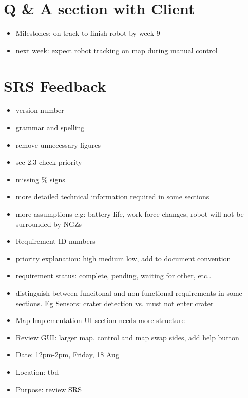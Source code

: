 \documentclass[11pt, a4paper]{article}
\begin{document}
\section{Q \& A section with Client}
\begin{itemize}
\item Milestones: on track to finish robot by week 9
\item next week: expect robot tracking on map during manual control
\end{itemize}

\section{SRS Feedback}
\begin{itemize}
\item version number
\item grammar and spelling
\item remove unnecessary figures
\item sec 2.3 check priority
\item missing \% signs
\item more detailed technical information required in some sections
\item more assumptions e.g: battery life, work force changes, robot will not be surrounded by NGZs
\item Requirement ID numbers
\item priority explanation: high medium low, add to document convention
\item requirement status: complete, pending, waiting for other, etc..
\item distinguish between funcitonal and non functional requirements in some sections. Eg Sensors: crater detection vs. must not enter crater
\item Map Implementation UI section needs more structure
\item Review GUI: larger map, control and map swap sides, add help button
\end{itemize}


\begin{itemize}
\item Date: 12pm-2pm, Friday, 18 Aug
\item Location: tbd
\item Purpose: review SRS
\end{itemize}

\vspace*{10pt}
\end{document}
